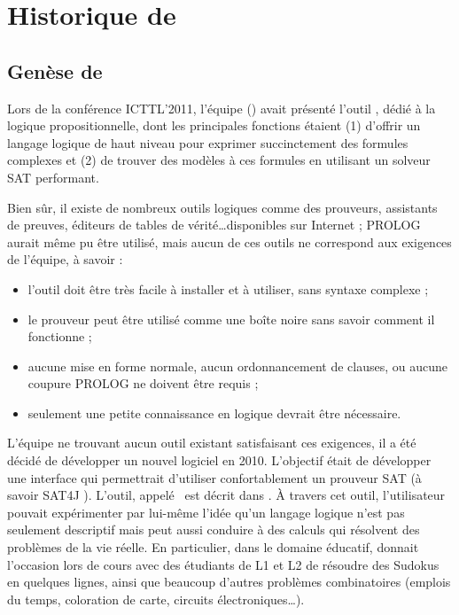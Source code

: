 \section{Historique de \touist}

\subsection{Genèse de \satoulouse}

Lors de la conférence ICTTL'2011, l'équipe (\citeauthor{GaScSt2011}) avait présenté l'outil \satoulouse \cite{GaScSt2011}, dédié à la logique propositionnelle, dont les principales fonctions étaient (1) d'offrir un langage logique de haut niveau pour exprimer succinctement des formules complexes et (2) de trouver des modèles à ces formules en utilisant un solveur SAT performant.

Bien sûr, il existe de nombreux outils logiques comme des prouveurs, assistants de preuves, éditeurs de tables de vérité\ldots disponibles sur Internet ; PROLOG aurait même pu être utilisé, mais aucun de ces outils ne correspond aux exigences de l'équipe, à savoir :
\begin{itemize}
\item l'outil doit être très facile à installer et à utiliser, sans syntaxe complexe ;
\item le prouveur peut être utilisé comme une boîte noire sans savoir comment il fonctionne ;
\item  aucune mise en forme normale,  aucun ordonnancement de clauses, ou aucune coupure PROLOG ne doivent être requis ;
\item seulement une petite connaissance en logique devrait être nécessaire.
\end{itemize} 

L'équipe ne trouvant aucun outil existant satisfaisant ces exigences, il a été décidé de développer un nouvel logiciel en 2010. L'objectif était de développer une interface qui permettrait d'utiliser confortablement un prouveur SAT (à savoir SAT4J \cite{DBLP:journals/jsat/BerreP10}). L'outil, appelé \satoulouse\, est décrit dans \cite{GaScSt2011}. À travers cet outil, l'utilisateur pouvait expérimenter par lui-même l'idée qu'un langage logique n'est pas seulement descriptif mais peut aussi conduire à des calculs qui résolvent des problèmes de la vie réelle. En particulier, dans le domaine éducatif, \satoulouse donnait l'occasion lors de cours avec des étudiants de L1 et L2 de résoudre des Sudokus en quelques lignes, ainsi que beaucoup d'autres problèmes combinatoires (emplois du temps, coloration de carte, circuits électroniques\ldots).\

